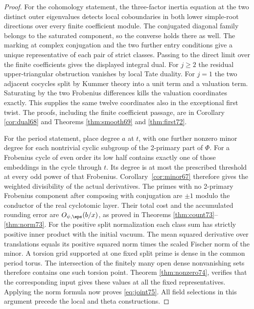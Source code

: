 \documentclass[a4paper,11pt]{article}
\theoremstyle{definition}
\theoremstyle{remark}
\numberwithin{equation}{section}
\begin{document}
\begin{proof}
For the cohomology statement, the three-factor inertia equation
at the two distinct outer eigenvalues detects local coboundaries
in both lower simple-root directions over every finite
coefficient module. The conjugated diagonal family belongs to
the saturated component, so the converse holds there as well.
The marking at complex conjugation and the two further entry
conditions give a unique representative of each pair of strict
classes. Passing to the direct limit over the finite coefficients
gives the displayed integral dual. For \(j\ge2\) the residual
upper-triangular obstruction vanishes by local Tate duality.
For \(j=1\) the two adjacent cocycles split by Kummer theory
into a unit term and a valuation term. Saturating by the two
Frobenius differences kills the valuation coordinates exactly.
This supplies the same twelve coordinates also in the exceptional
first twist. The proofs, including the finite coefficient
passage, are in
Corollary \ref{cor:dual68} and Theorems \ref{thm:smooth69} and \ref{thm:first72}.

For the period statement, place degree \(a\) at \(t\), with
one further nonzero minor degree for each nontrivial cyclic
subgroup of the 2-primary part of \(\Phi\). For a Frobenius
cycle of even order its low half contains exactly one of those
embeddings in the cycle through \(t\). Its degree is at most
the prescribed threshold at every odd power of that Frobenius.
Corollary~\ref{cor:minor67} therefore gives the weighted
divisibility of the actual derivatives. The primes with no
2-primary Frobenius component after composing with conjugation
are \(\pm1\) modulo the conductor of the real cyclotomic layer.
Their total cost and the accumulated rounding error are
\(O_{\psi,\eps}(b/x)\), as proved in Theorems
\ref{thm:count73}--\ref{thm:norm73}. For the positive split normalization each class sum
has strictly positive inner product with the initial vacuum.
The mean squared derivative over translations equals its
positive squared norm times the scaled Fischer norm of the
minor. A torsion grid supported at one fixed split prime is
dense in the common period torus. The intersection of the
finitely many open dense nonvanishing sets therefore contains
one such torsion point. Theorem \ref{thm:nonzero74}, verifies that
the corresponding input gives these values at all the fixed
representatives. Applying the norm formula now proves
\eqref{eq:joint75}. All field selections in this argument precede
the local and theta constructions.
\end{proof}
\end{document}
